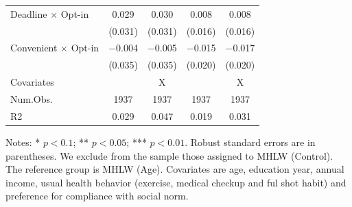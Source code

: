 \documentclass[
]{article}
\begin{document}
\begin{table}
\begin{threeparttable}
\begin{tabular}[t]{lcccc}
Deadline $\times$ Opt-in & \num{0.029} & \num{0.030} & \num{0.008} & \num{0.008}\\
 & (\num{0.031}) & (\num{0.031}) & (\num{0.016}) & (\num{0.016})\\
Convenient $\times$ Opt-in & \num{-0.004} & \num{-0.005} & \num{-0.015} & \num{-0.017}\\
 & (\num{0.035}) & (\num{0.035}) & (\num{0.020}) & (\num{0.020})\\
\midrule
Covariates &  & X &  & X\\
Num.Obs. & \num{1937} & \num{1937} & \num{1937} & \num{1937}\\
R2 & \num{0.029} & \num{0.047} & \num{0.019} & \num{0.031}\\
\bottomrule
\end{tabular}
\begin{tablenotes}
\item Notes: * $p < 0.1$; ** $p < 0.05$; *** $p < 0.01$. Robust standard errors are in parentheses. We exclude from the sample those assigned to MHLW (Control). The reference group is MHLW (Age). Covariates are age, education year, annual income, usual health behavior (exercise, medical checkup and ful shot habit) and preference for compliance with social norm.
\end{tablenotes}
\end{threeparttable}
\end{table}
\end{document}
